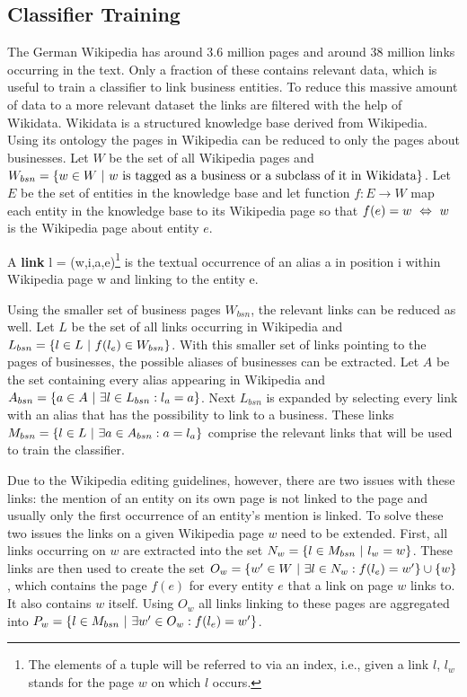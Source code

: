 \subsection{Classifier Training}
The German Wikipedia has around 3.6 million pages and around 38 million links occurring in the text. Only a fraction of these contains relevant data, which is useful to train a classifier to link business entities. To reduce this massive amount of data to a more relevant dataset the links are filtered with the help of Wikidata. Wikidata is a structured knowledge base derived from Wikipedia. Using its ontology the pages in Wikipedia can be reduced to only the pages about businesses. Let $W$ be the set of all Wikipedia pages and $W_{bsn} = \{ w \in W {\mbox{ }|\mbox{ }} w \text{ is tagged as a business or a subclass of it in Wikidata} \}$. Let $E$ be the set of entities in the knowledge base and let function $f: E \to W$ map each entity in the knowledge base to its Wikipedia page so that $f(e) = w {\mbox{ }\Leftrightarrow\mbox{ }} w$ is the Wikipedia page about entity $e$.
\begin{definition}
A \textbf{link} l = (w,i,a,e)\footnote{The elements of a tuple will be referred to via an index, i.e., given a link $l$, $l_w$ stands for the page $w$ on which $l$ occurs. } is the textual occurrence of an alias a in position i within Wikipedia page w and linking to the entity e.
\label{link}
\end{definition}
Using the smaller set of business pages $W_{bsn}$, the relevant links can be reduced as well. Let $L$ be the set of all links occurring in Wikipedia and $L_{bsn} = \{ l \in L {\mbox{ }|\mbox{ }} f(l_e) \in W_{bsn} \}$. With this smaller set of links pointing to the pages of businesses, the possible aliases of businesses can be extracted. Let $A$ be the set containing every alias appearing in Wikipedia and $A_{bsn} = \{ a \in A {\mbox{ }|\mbox{ }} \exists l \in L_{bsn}: l_a = a \}$. Next $L_{bsn}$ is expanded by selecting every link with an alias that has the possibility to link to a business. These links $M_{bsn} = \{ l \in L {\mbox{ }|\mbox{ }} \exists a \in A_{bsn}: a = l_a \}$ comprise the relevant links that will be used to train the classifier.\par
Due to the Wikipedia editing guidelines, however, there are two issues with these links: the mention of an entity on its own page is not linked to the page and usually only the first occurrence of an entity's mention is linked. To solve these two issues the links on a given Wikipedia page $w$ need to be extended. First, all links occurring on $w$ are extracted into the set $N_w = \{ l \in M_{bsn} {\mbox{ }|\mbox{ }} l_w = w\}$. These links are then used to create the set $O_w = \{ w' \in W {\mbox{ }|\mbox{ }} \exists l \in N_w: f(l_e) = w' \} \cup \{ w \}$, which contains the page $f(e)$ for every entity $e$ that a link on page $w$ links to. It also contains $w$ itself. Using $O_w$ all links linking to these pages are aggregated into $P_w = \{ l \in M_{bsn} {\mbox{ }|\mbox{ }} \exists w' \in O_w: f(l_e) = w' \}$.\par
